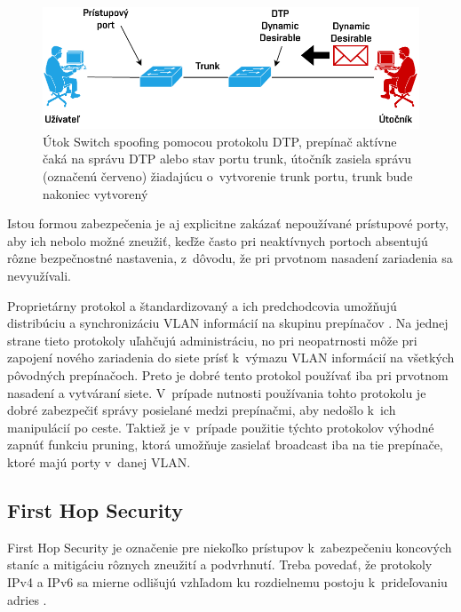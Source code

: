\begin{figure}[H]
	\begin{center}
		\includegraphics[scale=0.75]{obrazky/switch-spoofing.pdf}
	\end{center}
	\caption[Útok Switch spoofing pomocou protokolu DTP]{Útok Switch spoofing pomocou protokolu DTP, prepínač aktívne čaká na správu DTP alebo stav portu trunk, útočník zasiela správu (označenú červeno) žiadajúcu o~vytvorenie trunk portu, trunk bude nakoniec vytvorený}
	\label{fig:switch-spoofing}
\end{figure} 


Istou formou zabezpečenia je aj explicitne zakázať nepoužívané prístupové porty, aby ich nebolo možné zneužiť, keďže často pri neaktívnych portoch absentujú rôzne bezpečnostné nastavenia, z~dôvodu, že pri prvotnom nasadení zariadenia sa nevyužívali.  

Proprietárny protokol  a štandardizovaný  a ich predchodcovia umožňujú distribúciu a synchronizáciu VLAN informácií na skupinu prepínačov \cite{Vyncke2008}. Na jednej strane tieto protokoly uľahčujú administráciu, no pri neopatrnosti môže pri zapojení nového zariadenia do siete prísť k~výmazu VLAN informácií na všetkých pôvodných prepínačoch. Preto je dobré tento protokol používať iba pri prvotnom nasadení a vytváraní siete. V~prípade nutnosti používania tohto protokolu je dobré zabezpečiť správy posielané medzi prepínačmi, aby nedošlo k~ich manipulácií po ceste. Taktiež je v~prípade použitie týchto protokolov výhodné zapnúť funkciu pruning, ktorá umožňuje zasielať broadcast iba na tie prepínače, ktoré majú porty v~danej VLAN. 


\subsection*{First Hop Security}
First Hop Security je označenie pre niekoľko prístupov k~zabezpečeniu koncových staníc a mitigáciu rôznych zneužití a podvrhnutí. Treba povedať, že protokoly IPv4 a IPv6 sa mierne odlišujú vzhľadom ku rozdielnemu postoju k~prideľovaniu adries \cite{Satrapa2019}.

